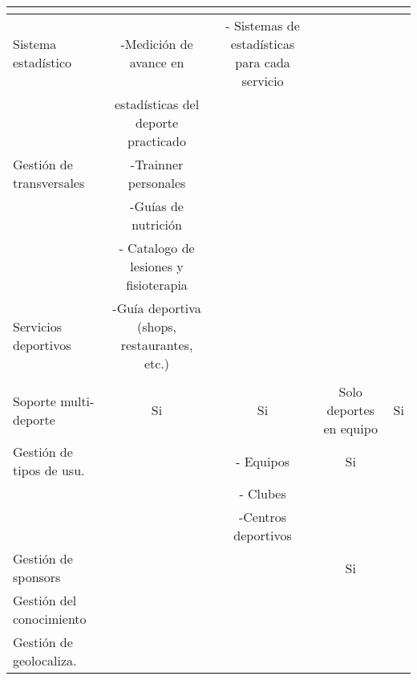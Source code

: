 \begin{landscape}
\begin{table}
\begin{center}
{\begin{tabular}{|l|llll|}
     & \multicolumn{1}{c}{} & \multicolumn{1}{c}{} & \multicolumn{1}{c}{} & \multicolumn{1}{c|}{} \\ 
    \hline
    Sistema estadístico & \multicolumn{1}{c}{-Medición de avance en} & \multicolumn{1}{c}{- Sistemas de estadísticas para cada servicio} & \multicolumn{1}{c}{} & \multicolumn{1}{c|}{} \\ 
     & \multicolumn{1}{c}{ estadísticas del deporte practicado} & \multicolumn{1}{c}{} & \multicolumn{1}{c}{} & \multicolumn{1}{c|}{} \\ 
    \hline
    Gestión de transversales & \multicolumn{1}{c}{-Trainner personales} & \multicolumn{1}{c}{} & \multicolumn{1}{c}{} & \multicolumn{1}{c|}{} \\ 
     & \multicolumn{1}{c}{-Guías de nutrición} & \multicolumn{1}{c}{} & \multicolumn{1}{c}{} & \multicolumn{1}{c|}{} \\ 
     & \multicolumn{1}{c}{- Catalogo de lesiones y fisioterapia} & \multicolumn{1}{c}{} & \multicolumn{1}{c}{} & \multicolumn{1}{c|}{} \\ 
    \hline
    Servicios deportivos & \multicolumn{1}{c}{-Guía deportiva (shops, restaurantes, etc.)} & \multicolumn{1}{c}{} & \multicolumn{1}{c}{} & \multicolumn{1}{c|}{} \\ 
     & \multicolumn{1}{c}{} & \multicolumn{1}{c}{} & \multicolumn{1}{c}{} & \multicolumn{1}{c|}{} \\ 
    \hline
    Soporte multi-deporte & \multicolumn{1}{c}{Si} & \multicolumn{1}{c}{Si} & \multicolumn{1}{c}{Solo deportes en equipo} & \multicolumn{1}{c|}{Si} \\ 
    \hline
    Gestión de tipos de usu. & \multicolumn{1}{c}{} & \multicolumn{1}{c}{- Equipos } & \multicolumn{1}{c}{Si} & \multicolumn{1}{c|}{} \\ 
     & \multicolumn{1}{c}{} & \multicolumn{1}{c}{- Clubes} & \multicolumn{1}{c}{} & \multicolumn{1}{c|}{} \\ 
     & \multicolumn{1}{c}{} & \multicolumn{1}{c}{-Centros deportivos} & \multicolumn{1}{c}{} & \multicolumn{1}{c|}{} \\ 
    \hline
    Gestión de sponsors & \multicolumn{1}{c}{} & \multicolumn{1}{c}{} & \multicolumn{1}{c}{Si} & \multicolumn{1}{c|}{} \\ 
    \hline
    Gestión del conocimiento & \multicolumn{1}{c}{} & \multicolumn{1}{c}{} & \multicolumn{1}{c}{} & \multicolumn{1}{c|}{} \\ 
    \hline
    Gestión de geolocaliza. & \multicolumn{1}{c}{} & \multicolumn{1}{c}{} & \multicolumn{1}{c}{} & \multicolumn{1}{c|}{} \\ 

\end{tabular}}
\end{center}
\end{table}
\end{landscape}
